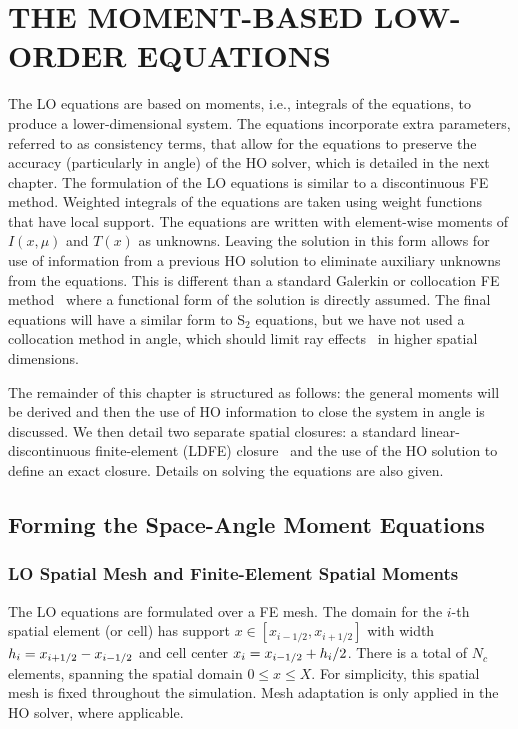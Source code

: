
\chapter{\uppercase{The Moment-Based Low-Order Equations}}
\label{chp:lo}

The LO equations are based on moments, i.e., integrals of the equations, to produce a
lower-dimensional system.  The equations incorporate extra parameters, referred to as
consistency terms, that allow for the equations to preserve the accuracy (particularly in
angle) of the HO solver, which is detailed in the next chapter. 
The formulation of the LO equations is similar to a discontinuous FE method.  Weighted
integrals of the equations are taken using weight functions that have local support. 
The equations are written with element-wise moments of $I(x,\mu)$ and $T(x)$ as
unknowns.  Leaving the solution in this form allows for use of information from a
previous HO solution to eliminate auxiliary unknowns from the equations. This is different
than a standard Galerkin or collocation FE
method~\cite{fem_book,morel_ldtrt,morel_notes} where a
functional form of the solution is directly assumed. The final equations will have a
similar form to S$_2$ equations, but we have not used a collocation method in angle,
which should limit ray effects~\cite{morel_notes,lewis} in higher spatial dimensions.

The remainder of this chapter is structured as follows: the general moments will be
derived and then the use of HO information to close the system in angle is discussed.
We then detail two separate spatial closures: a standard linear-discontinuous finite-element (LDFE)
closure~\cite{morel_ldtrt} and the use of the HO solution to define an exact closure.  Details on solving the equations are also given.

\section{Forming the Space-Angle Moment Equations}

\subsection{LO Spatial Mesh and Finite-Element Spatial Moments}

The LO equations are formulated over a FE mesh.  The domain for the $i$-th spatial
element (or cell) has support $x\in[x_{i-1/2},x_{i+1/2}]$ with width $h_i=x_{i+1/2} -
x_{{i-1/2}}$ and cell center 
$x_i = x_{{i-1/2}} + h_i/2$.  There is a total of $N_c$ elements, spanning the
spatial domain $0\leq x\leq X$.  For simplicity, this spatial mesh is fixed throughout the
simulation.  Mesh adaptation is only applied in the HO solver, where applicable.

